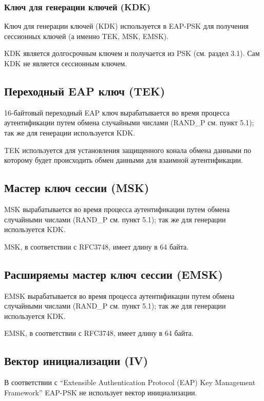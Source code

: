 \subsubsection{Ключ для генерации ключей (KDK)}

Ключ для генерации ключей (KDK) используется в EAP-PSK для получения сессионных ключей (а именно TEK, MSK, EMSK).

KDK является долгосрочным ключем и получается из PSK (см. раздел 3.1). Сам KDK не является сессионным ключем.

\subsection{Переходный EAP ключ (TEK)}

16-байтовый переходный EAP ключ вырабатывается во время процесса аутентификации путем обмена случайными числами (RAND\_P см. пункт 5.1); так же для генерации используется KDK.

TEK используется для установления защищенного конала обмена данными по которому будет происходить обмен данными для взаимной аутентификации.

\subsection{Мастер ключ сессии (MSK)}

MSK вырабатывается во время процесса аутентификации путем обмена случайными числами (RAND\_P см. пункт 5.1); так же для генерации используется KDK.

MSK, в соответствии с RFC3748, имеет длину в 64 байта.

\subsection{Расширяемы мастер ключ сессии (EMSK)}

EMSK вырабатывается во время процесса аутентификации путем обмена случайными числами (RAND\_P см. пункт 5.1); так же для генерации используется KDK.

EMSK, в соответствии с RFC3748, имеет длину в 64 байта.

\subsection{Вектор инициализации (IV)}

В соответствии с ``Extensible Authentication Protocol (EAP) Key Management Framework'' EAP-PSK не использует вектор инициализации.
